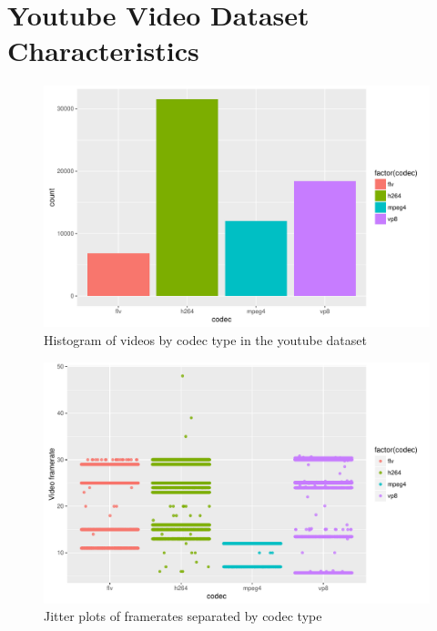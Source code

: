 \documentclass[letterpaper,12pt,titlepage,oneside,final]{report}
\begin{document}
    \section {Youtube Video Dataset Characteristics}
        \label{app:ytvideo}
        \begin{figure}[!h]
            \centering
            \includegraphics[width=\textwidth]{codec_hist}
            \caption{Histogram of videos by codec type in the youtube dataset}
            \label{codec_hist}
        \end{figure}
        \begin{figure}[!h]
            \centering
            \includegraphics[width=\textwidth]{framerate_hist}
            \caption{Jitter plots of framerates separated by codec type}
            \label{framerate_hist}
        \end{figure}
\end{document}
